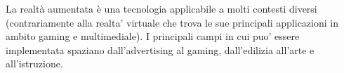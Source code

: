 La realtà aumentata è una tecnologia applicabile a molti contesti diversi (contrariamente alla realta' virtuale che trova le sue principali applicazioni in ambito gaming e multimediale). I principali campi in cui puo' essere implementata spaziano dall'advertising al gaming, dall'edilizia all'arte e all'istruzione.